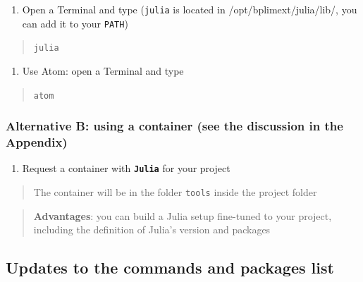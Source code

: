 \documentclass[
  11pt,
  a4paper,
]{article}
\providecommand{\tightlist}{%
  \setlength{\itemsep}{0pt}\setlength{\parskip}{0pt}}
\begin{document}
\begin{enumerate}
\def\labelenumi{\arabic{enumi}.}
\tightlist
\item
  Open a Terminal and type (\texttt{julia} is located in
  /opt/bplimext/julia/lib/, you can add it to your \texttt{PATH})
\end{enumerate}

\begin{quote}
\texttt{julia}
\end{quote}

\begin{enumerate}
\def\labelenumi{\arabic{enumi}.}
\setcounter{enumi}{1}
\tightlist
\item
  Use Atom: open a Terminal and type
\end{enumerate}

\begin{quote}
\texttt{atom}
\end{quote}

\hypertarget{alternative-b-using-a-container-see-the-discussion-in-the-appendix}{%
\subsubsection{Alternative B: using a container (see the discussion in
the
Appendix)}\label{alternative-b-using-a-container-see-the-discussion-in-the-appendix}}

\begin{enumerate}
\def\labelenumi{\arabic{enumi}.}
\tightlist
\item
  Request a container with \textbf{\texttt{Julia}} for your project
\end{enumerate}

\begin{quote}
The container will be in the folder \texttt{tools} inside the project
folder
\end{quote}

\begin{quote}
\textbf{Advantages}: you can build a Julia setup fine-tuned to your
project, including the definition of Julia's version and packages
\end{quote}

\hypertarget{updates-to-the-commands-and-packages-list}{%
\subsection{Updates to the commands and packages
list}\label{updates-to-the-commands-and-packages-list}}
\end{document}
